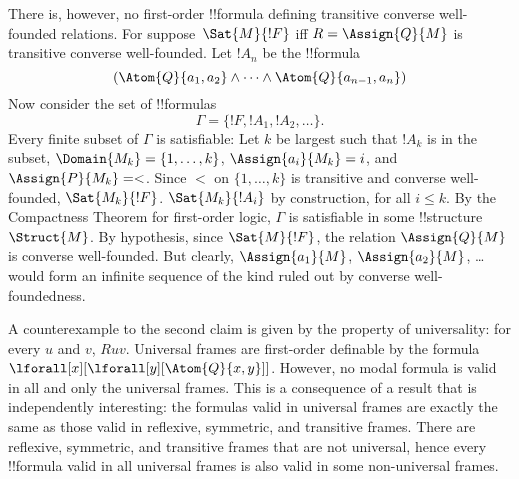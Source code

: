 \documentclass[../../../include/open-logic-section]{subfiles}
\begin{document}
There is, however, no first-order !!{formula} defining transitive
converse well-founded relations. For suppose~$\Sat{M}{!F}$ iff $R =
\Assign{Q}{M}$ is transitive converse well-founded. Let $!A_n$ be the
!!{formula}
\[
(\Atom{Q}{a_1,a_2} \land \dots \land
    \Atom{Q}{a_{n-1},a_{n}})
\]
Now consider the set of !!{formula}s
\[
\Gamma = \{!F, !A_1, !A_2, \dots\}.
\]
Every finite subset of $\Gamma$ is satisfiable: Let $k$ be largest
such that $!A_k$ is in the subset, $\Domain{M_k} = \{1, \dots, k\}$,
$\Assign{a_i}{M_k} = i$, and $\Assign{P}{M_k} = <$. Since $<$ on $\{1,
\dots, k\}$ is transitive and converse well-founded,
$\Sat{M_k}{!F}$. $\Sat{M_k}{!A_i}$ by construction, for all $i \le k$.
By the Compactness Theorem for first-order logic, $\Gamma$ is
satisfiable in some !!{structure}~$\Struct{M}$. By hypothesis, since
$\Sat{M}{!F}$, the relation $\Assign{Q}{M}$ is converse
well-founded. But clearly, $\Assign{a_1}{M}$, $\Assign{a_2}{M}$,
\dots{} would form an infinite sequence of the kind ruled out by
converse well-foundedness.

A counterexample to the second claim is given by the property of
universality: for every $u$ and $v$, $Ruv$. Universal frames are
first-order definable by the formula
$\lforall[x][\lforall[y][\Atom{Q}{x,y}]]$.  However, no modal formula
is valid in all and only the universal frames. This is a consequence
of a result that is independently interesting: the formulas valid in
universal frames are exactly the same as those valid in reflexive,
symmetric, and transitive frames. There are reflexive, symmetric, and
transitive frames that are not universal, hence every !!{formula}
valid in all universal frames is also valid in some non-universal
frames.
\end{document}

